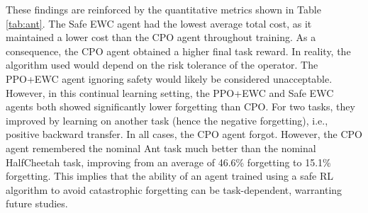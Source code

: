 These findings are reinforced by the quantitative metrics shown in Table \ref{tab:ant}. The Safe EWC agent had the lowest average total cost, as it maintained a lower cost than the CPO agent throughout training. As a consequence, the CPO agent obtained a higher final task reward. In reality, the algorithm used would depend on the risk tolerance of the operator. The PPO+EWC agent ignoring safety would likely be considered unacceptable. However, in this continual learning setting, the PPO+EWC and Safe EWC agents both showed significantly lower forgetting than CPO. For two tasks, they improved by learning on another task (hence the negative forgetting), i.e., positive backward transfer. In all cases, the CPO agent forgot. However, the CPO agent remembered the nominal Ant task much better than the nominal HalfCheetah task, improving from an average of 46.6\% forgetting to 15.1\% forgetting. This implies that the ability of an agent trained using a safe RL algorithm to avoid catastrophic forgetting can be task-dependent, warranting future studies.